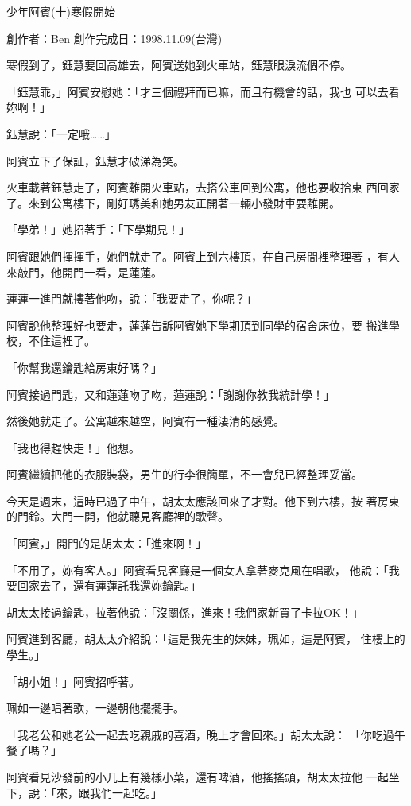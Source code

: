 



少年阿賓(十)寒假開始

創作者：Ben
創作完成日：1998.11.09(台灣)


寒假到了，鈺慧要回高雄去，阿賓送她到火車站，鈺慧眼淚流個不停。

「鈺慧乖，」阿賓安慰她：「才三個禮拜而已嘛，而且有機會的話，我也
可以去看妳啊！」

鈺慧說：「一定哦……」

阿賓立下了保証，鈺慧才破涕為笑。

火車載著鈺慧走了，阿賓離開火車站，去搭公車回到公寓，他也要收拾東
西回家了。來到公寓樓下，剛好琇美和她男友正開著一輛小發財車要離開。

「學弟！」她招著手：「下學期見！」

阿賓跟她們揮揮手，她們就走了。阿賓上到六樓頂，在自己房間裡整理著
，有人來敲門，他開門一看，是蓮蓮。

蓮蓮一進門就摟著他吻，說：「我要走了，你呢？」

阿賓說他整理好也要走，蓮蓮告訴阿賓她下學期頂到同學的宿舍床位，要
搬進學校，不住這裡了。

「你幫我還鑰匙給房東好嗎？」

阿賓接過門匙，又和蓮蓮吻了吻，蓮蓮說：「謝謝你教我統計學！」

然後她就走了。公寓越來越空，阿賓有一種淒清的感覺。

「我也得趕快走！」他想。

阿賓繼續把他的衣服裝袋，男生的行李很簡單，不一會兒已經整理妥當。

今天是週末，這時已過了中午，胡太太應該回來了才對。他下到六樓，按
著房東的門鈴。大門一開，他就聽見客廳裡的歌聲。

「阿賓，」開門的是胡太太：「進來啊！」

「不用了，妳有客人。」阿賓看見客廳是一個女人拿著麥克風在唱歌，
他說：「我要回家去了，還有蓮蓮託我還妳鑰匙。」

胡太太接過鑰匙，拉著他說：「沒關係，進來！我們家新買了卡拉OK！」

阿賓進到客廳，胡太太介紹說：「這是我先生的妹妹，珮如，這是阿賓，
住樓上的學生。」

「胡小姐！」阿賓招呼著。

珮如一邊唱著歌，一邊朝他擺擺手。

「我老公和她老公一起去吃親戚的喜酒，晚上才會回來。」胡太太說：
「你吃過午餐了嗎？」

阿賓看見沙發前的小几上有幾樣小菜，還有啤酒，他搖搖頭，胡太太拉他
一起坐下，說：「來，跟我們一起吃。」

